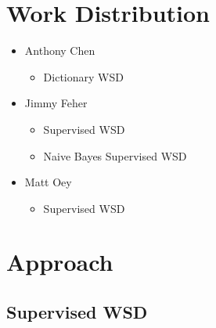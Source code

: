 \documentclass[11pt]{article}
\begin{document}
\setlength{\parindent}{0in}
\addtolength{\parskip}{0.1cm}
\setlength{\fboxrule}{.5mm}\setlength{\fboxsep}{1.2mm}
\newlength{\boxlength}\setlength{\boxlength}{\textwidth}
\addtolength{\boxlength}{-4mm}

\begin{center}
\end{center}

\section{Work Distribution}
\begin{itemize}
    \item Anthony Chen 
        \begin{itemize}
            \item Dictionary WSD
        \end{itemize}    
    \item Jimmy Feher
        \begin{itemize}
            \item Supervised WSD
			\item Naive Bayes Supervised WSD
        \end{itemize}  
    \item Matt Oey
        \begin{itemize}
            \item Supervised WSD
        \end{itemize}  
\end{itemize}

\section{Approach}
\subsection{Supervised WSD}
\end{document}

